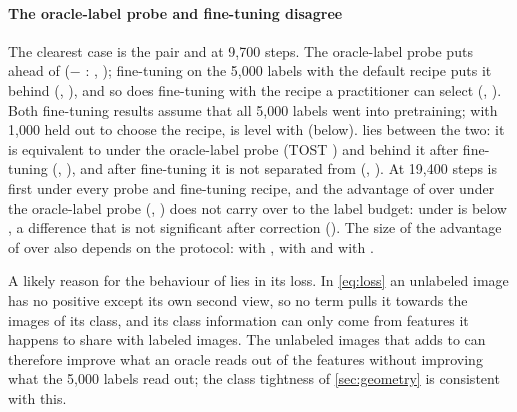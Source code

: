 \paragraph{The oracle-label probe and fine-tuning disagree}
The clearest case is the pair \simclr and \union at 9,700 steps. The oracle-label probe puts \union ahead of
\simclr (\simclr $-$ \union: \pt, ); fine-tuning
on the 5,000 labels with the default recipe puts it behind (\pt,
), and so does fine-tuning with the recipe a practitioner can select
(\pt, ). Both fine-tuning results assume that all
5,000 labels went into pretraining; with 1,000 held out to choose the recipe, \union is level with \simclr (below). \supcon lies between the two: it is
equivalent to \simclr under the oracle-label probe (TOST ) and behind it
after fine-tuning (\pt, ), and after fine-tuning
it is not separated from \union (\pt, ). At
19,400 steps \simclr is first under every probe and fine-tuning recipe, and the advantage of \union over \supcon under the
oracle-label probe (\pt, ) does not carry over
to the label budget: under \lpfive \union is \pt below \supcon, a difference that is
not significant after correction (). The size of the advantage of \simclr over
\supcon also depends on the protocol: \pt with \lpall,
\pt with \lpfive and \pt with \ftfive.

A likely reason for the behaviour of \union lies in its loss. In \cref{eq:loss} an unlabeled image has no
positive except its own second view, so no term pulls it towards the images of its class, and its class
information can only come from features it happens to share with labeled images. The unlabeled images that
\union adds to \supcon can therefore improve what an oracle reads out of the features without improving what the
5,000 labels read out; the class tightness of \cref{sec:geometry} is consistent with this.

